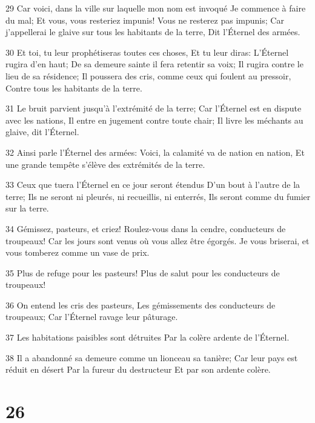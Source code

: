 \par 29 Car voici, dans la ville sur laquelle mon nom est invoqué Je commence à faire du mal; Et vous, vous resteriez impunis! Vous ne resterez pas impunis; Car j'appellerai le glaive sur tous les habitants de la terre, Dit l'Éternel des armées.
\par 30 Et toi, tu leur prophétiseras toutes ces choses, Et tu leur diras: L'Éternel rugira d'en haut; De sa demeure sainte il fera retentir sa voix; Il rugira contre le lieu de sa résidence; Il poussera des cris, comme ceux qui foulent au pressoir, Contre tous les habitants de la terre.
\par 31 Le bruit parvient jusqu'à l'extrémité de la terre; Car l'Éternel est en dispute avec les nations, Il entre en jugement contre toute chair; Il livre les méchants au glaive, dit l'Éternel.
\par 32 Ainsi parle l'Éternel des armées: Voici, la calamité va de nation en nation, Et une grande tempête s'élève des extrémités de la terre.
\par 33 Ceux que tuera l'Éternel en ce jour seront étendus D'un bout à l'autre de la terre; Ils ne seront ni pleurés, ni recueillis, ni enterrés, Ils seront comme du fumier sur la terre.
\par 34 Gémissez, pasteurs, et criez! Roulez-vous dans la cendre, conducteurs de troupeaux! Car les jours sont venus où vous allez être égorgés. Je vous briserai, et vous tomberez comme un vase de prix.
\par 35 Plus de refuge pour les pasteurs! Plus de salut pour les conducteurs de troupeaux!
\par 36 On entend les cris des pasteurs, Les gémissements des conducteurs de troupeaux; Car l'Éternel ravage leur pâturage.
\par 37 Les habitations paisibles sont détruites Par la colère ardente de l'Éternel.
\par 38 Il a abandonné sa demeure comme un lionceau sa tanière; Car leur pays est réduit en désert Par la fureur du destructeur Et par son ardente colère.

\chapter{26}

